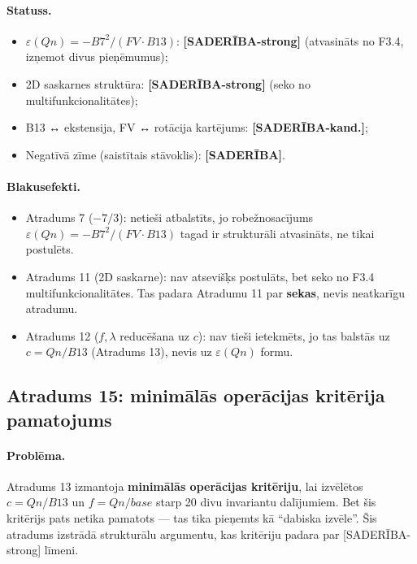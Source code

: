 \documentclass[12pt,a4paper]{article}
\begin{document}
\paragraph{Statuss.}
\begin{itemize}
    \item $\varepsilon(Qn) = -B7^2/(FV \cdot B13)$: \textbf{[SADERĪBA-strong]} (atvasināts no F3.4, izņemot divus pieņēmumus);
    \item 2D saskarnes struktūra: \textbf{[SADERĪBA-strong]} (seko no multifunkcionalitātes);
    \item B13 ↔ ekstensija, FV ↔ rotācija kartējums: \textbf{[SADERĪBA-kand.]};
    \item Negatīvā zīme (saistītais stāvoklis): \textbf{[SADERĪBA]}.
\end{itemize}

\paragraph{Blakusefekti.}
\begin{itemize}
    \item Atradums 7 ($-7/3$): netieši atbalstīts, jo robežnosacījums $\varepsilon(Qn) = -B7^2/(FV \cdot B13)$ tagad ir strukturāli atvasināts, ne tikai postulēts.
    \item Atradums 11 (2D saskarne): nav atsevišķs postulāts, bet seko no F3.4 multifunkcionalitātes. Tas padara Atradumu 11 par \textbf{sekas}, nevis neatkarīgu atradumu.
    \item Atradums 12 ($f, \lambda$ reducēšana uz $c$): nav tieši ietekmēts, jo tas balstās uz $c = Qn/B13$ (Atradums 13), nevis uz $\varepsilon(Qn)$ formu.
\end{itemize}

\subsection*{Atradums 15: minimālās operācijas kritērija pamatojums}

\paragraph{Problēma.}
Atradums 13 izmantoja \textbf{minimālās operācijas kritēriju}, lai izvēlētos $c = Qn/B13$ un $f = Qn/base$ starp 20 divu invariantu dalījumiem. Bet šis kritērijs pats netika pamatots — tas tika pieņemts kā ``dabiska izvēle''. Šis atradums izstrādā strukturālu argumentu, kas kritēriju padara par [SADERĪBA-strong] līmeni.
\end{document}
